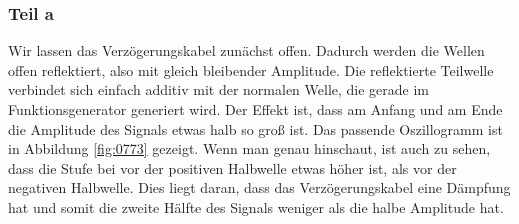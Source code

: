 \FloatBarrier
\subsubsection{Teil a}

Wir lassen das Verzögerungskabel zunächst offen. Dadurch werden die Wellen
offen reflektiert, also mit gleich bleibender Amplitude. Die reflektierte
Teilwelle verbindet sich einfach additiv mit der normalen Welle, die gerade im
Funktionsgenerator generiert wird. Der Effekt ist, dass am Anfang und am Ende
die Amplitude des Signals etwas halb so groß ist. Das passende Oszillogramm ist
in Abbildung \ref{fig:0773} gezeigt. Wenn man genau hinschaut, ist auch zu
sehen, dass die Stufe bei vor der positiven Halbwelle etwas höher ist, als vor
der negativen Halbwelle. Dies liegt daran, dass das Verzögerungskabel eine
Dämpfung hat und somit die zweite Hälfte des Signals weniger als die halbe
Amplitude hat.

